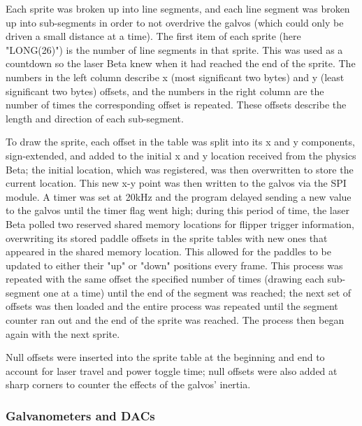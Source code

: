 \documentclass{article}
\begin{document}
Each sprite was broken up into line segments, and each line segment was broken up into sub-segments in order to not overdrive the galvos (which could only be driven a small distance at a time). The first item of each sprite (here "LONG(26)") is the number of line segments in that sprite. This was used as a countdown so the laser Beta knew when it had reached the end of the sprite. The numbers in the left column describe x (most significant two bytes) and y (least significant two bytes) offsets, and the numbers in the right column are the number of times the corresponding offset is repeated. These offsets describe the length and direction of each sub-segment.

 To draw the sprite, each offset in the table was split into its x and y components, sign-extended, and added to the initial x and y location received from the physics Beta; the initial location, which was registered, was then overwritten to store the current location. This new x-y point was then written to the galvos via the SPI module. A timer was set at 20kHz and the program delayed sending a new value to the galvos until the timer flag went high; during this period of time, the laser Beta polled two reserved shared memory locations for flipper trigger information, overwriting its stored paddle offsets in the sprite tables with new ones that appeared in the shared memory location. This allowed for the paddles to be updated to either their "up" or "down" positions every frame. This process was repeated with the same offset the specified number of times (drawing each sub-segment one at a time) until the end of the segment was reached; the next set of offsets was then loaded and the entire process was repeated until the segment counter ran out and the end of the sprite was reached. The process then began again with the next sprite.
 
Null offsets were inserted into the sprite table at the beginning and end to account for laser travel and power toggle time; null offsets were also added at sharp corners to counter the effects of the galvos' inertia.

\subsubsection{Galvanometers and DACs} \label{galvos}
\end{document}
